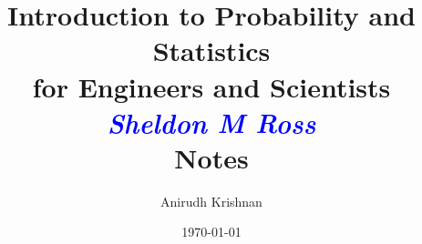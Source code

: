 \documentclass[letterpaper,12pt]{report}
\begin{document}
\author{Anirudh Krishnan}
\title{Introduction to Probability and Statistics \\ for Engineers and Scientists \\ \textit{\textcolor{blue}{Sheldon M Ross}} \\ Notes}
\date{\today}

\maketitle
\tableofcontents















\end{document}
